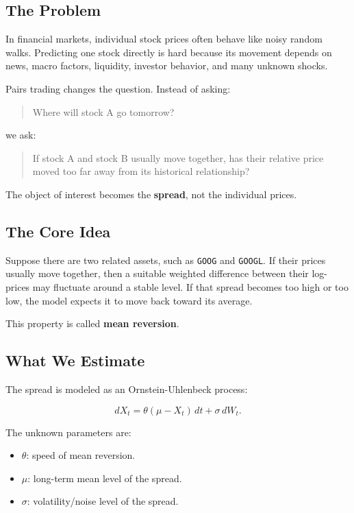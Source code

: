 \documentclass[11pt]{article}
\newcommand{\code}[1]{\texttt{#1}}
\begin{document}
\subsection{The Problem}

In financial markets, individual stock prices often behave like noisy random
walks. Predicting one stock directly is hard because its movement depends on
news, macro factors, liquidity, investor behavior, and many unknown shocks.

Pairs trading changes the question. Instead of asking:

\begin{quote}
Where will stock A go tomorrow?
\end{quote}

we ask:

\begin{quote}
If stock A and stock B usually move together, has their relative price moved too
far away from its historical relationship?
\end{quote}

The object of interest becomes the \textbf{spread}, not the individual prices.

\subsection{The Core Idea}

Suppose there are two related assets, such as \code{GOOG} and \code{GOOGL}. If
their prices usually move together, then a suitable weighted difference between
their log-prices may fluctuate around a stable level. If that spread becomes too
high or too low, the model expects it to move back toward its average.

This property is called \textbf{mean reversion}.

\subsection{What We Estimate}

The spread is modeled as an Ornstein-Uhlenbeck process:

\[
dX_t = \theta(\mu - X_t)\,dt + \sigma\,dW_t.
\]

The unknown parameters are:

\begin{itemize}
  \item $\theta$: speed of mean reversion.
  \item $\mu$: long-term mean level of the spread.
  \item $\sigma$: volatility/noise level of the spread.
\end{itemize}
\end{document}
